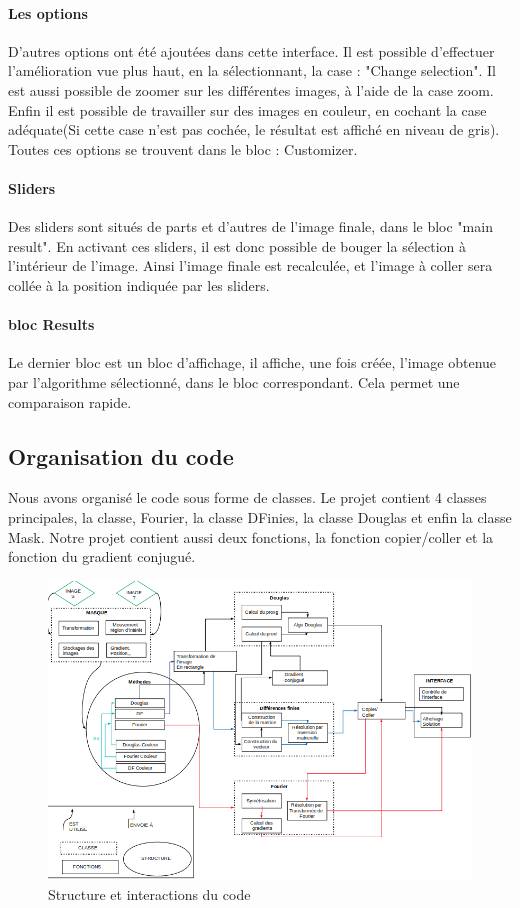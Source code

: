 \paragraph{Les options}
D'autres options ont été ajoutées dans cette interface. Il est possible d'effectuer l'amélioration vue plus haut, en la sélectionnant, la case : "Change selection". Il est aussi possible de zoomer sur les différentes images, à l'aide de la case zoom. Enfin il est possible de travailler sur des images en couleur, en cochant la case adéquate(Si cette case n'est pas cochée, le résultat est affiché en niveau de gris). Toutes ces options se trouvent dans le bloc : Customizer.
\paragraph{Sliders}
Des sliders sont situés de parts et d'autres de l'image finale, dans le bloc "main result". En activant ces sliders, il est donc possible de bouger la sélection à l'intérieur de l'image. Ainsi l'image finale est recalculée, et l'image à coller sera collée à la position indiquée par les sliders.
\paragraph{bloc Results}
Le dernier bloc est un bloc d'affichage, il affiche, une fois créée, l'image obtenue par l'algorithme sélectionné, dans le bloc correspondant. Cela permet une comparaison rapide.
\subsection{Organisation du code}
Nous avons organisé le code sous forme de classes. Le projet contient 4 classes principales, la classe, Fourier, la classe DFinies, la classe Douglas et enfin la classe  Mask. Notre projet contient aussi deux fonctions, la fonction copier/coller et la fonction du gradient conjugué.


\begin{figure}[!h]
\includegraphics[scale=0.65]{Images/code/schema.png}
\caption{Structure et interactions du code}
\end{figure}
\newpage

